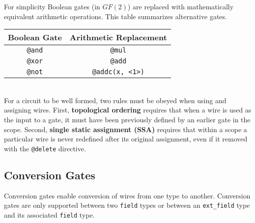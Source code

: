 For simplicity Boolean gates (in $GF(2)$) are replaced with mathematically equivalent arithmetic operations.
This table summarizes alternative gates. \\

\noindent\begin{tabular}{|c|c|}
  \hline
  \textbf{Boolean Gate} & \textbf{Arithmetic Replacement} \\
  \hline
  \verb|@and|           & \verb|@mul|                     \\
  \verb|@xor|           & \verb|@add|                     \\
  \verb|@not|           & \verb|@addc(x, <1>)|            \\
  \hline
\end{tabular} \\

For a circuit to be well formed, two rules must be obeyed when using and assigning wires.
First, \textbf{topological ordering} requires that when a wire is used as the input to a gate, it must have been previously defined by an earlier gate in the scope.
Second, \textbf{single static assignment (SSA)} requires that within a scope a particular wire is never redefined after its original assignment, even if it removed with the \texttt{@delete} directive.\\

\subsection{Conversion Gates}
\label{subsec:conversiongates}
Conversion gates enable conversion of wires from one type to another.
Conversion gates are only supported between two \texttt{field} types or between
an \texttt{ext\_field} type and its associated \texttt{field} type.

